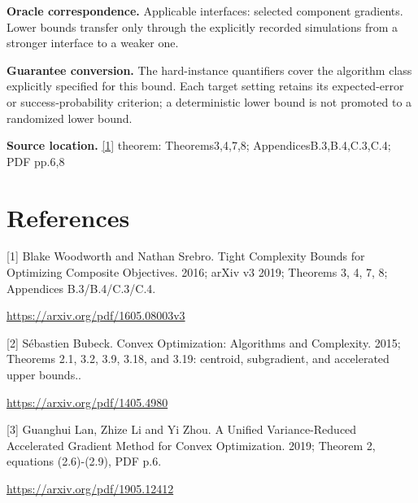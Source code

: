 \documentclass[10pt,a4paper]{article}
\begin{document}
\textbf{Oracle correspondence.} Applicable interfaces: selected component gradients. Lower bounds transfer only through the explicitly recorded simulations from a stronger interface to a weaker one.

\textbf{Guarantee conversion.} The hard-instance quantifiers cover the algorithm class explicitly specified for this bound. Each target setting retains its expected-error or success-probability criterion; a deterministic lower bound is not promoted to a randomized lower bound.

\textbf{Source location.} \href{https://arxiv.org/pdf/1605.08003v3}{[1]} theorem: Theorems3,4,7,8; AppendicesB.3,B.4,C.3,C.4; PDF pp.6,8

\section{References}
[1] Blake Woodworth and Nathan Srebro. Tight Complexity Bounds for Optimizing Composite Objectives. 2016; arXiv v3 2019; Theorems 3, 4, 7, 8; Appendices B.3/B.4/C.3/C.4.

\url{https://arxiv.org/pdf/1605.08003v3}

[2] Sébastien Bubeck. Convex Optimization: Algorithms and Complexity. 2015; Theorems 2.1, 3.2, 3.9, 3.18, and 3.19: centroid, subgradient, and accelerated upper bounds..

\url{https://arxiv.org/pdf/1405.4980}

[3] Guanghui Lan, Zhize Li and Yi Zhou. A Unified Variance-Reduced Accelerated Gradient Method for Convex Optimization. 2019; Theorem 2, equations (2.6)-(2.9), PDF p.6.

\url{https://arxiv.org/pdf/1905.12412}
\end{document}
